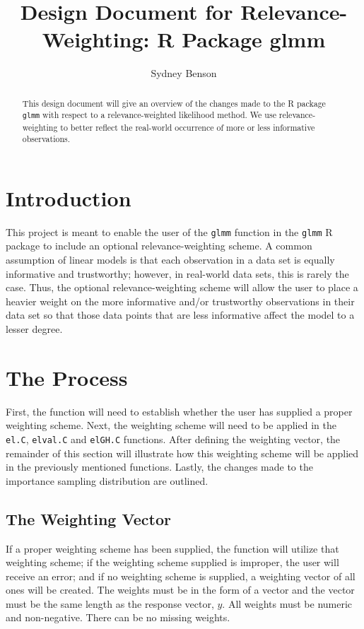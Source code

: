 \documentclass{article}
\title{Design Document for Relevance-Weighting: R Package glmm}
\author{Sydney Benson}
\begin{document}
\maketitle{}

\begin{abstract}
This design document will give an overview of the changes made to the R package \texttt{glmm} with respect to a relevance-weighted likelihood method. We use relevance-weighting to better reflect the real-world occurrence of more or less informative observations.
\end{abstract}

\section{Introduction}
This project is meant to enable the user of the \texttt{glmm} function in the \texttt{glmm} R package to include an optional relevance-weighting scheme. A common assumption of linear models is that each observation in a data set is equally informative and trustworthy; however, in real-world data sets, this is rarely the case. Thus, the optional relevance-weighting scheme will allow the user to place a heavier weight on the more informative and/or trustworthy observations in their data set so that those data points that are less informative affect the model to a lesser degree.

\section{The Process}
First, the function will need to establish whether the user has supplied a proper weighting scheme. Next, the weighting scheme will need to be applied in the \texttt{el.C}, \texttt{elval.C} and \texttt{elGH.C} functions. After defining the weighting vector, the remainder of this section will illustrate how this weighting scheme will be applied in the previously mentioned functions. Lastly, the changes made to the importance sampling distribution are outlined.

\subsection{The Weighting Vector}
If a proper weighting scheme has been supplied, the function will utilize that weighting scheme; if  the weighting scheme supplied is improper, the user will receive an error; and if no weighting scheme is supplied, a weighting vector of all ones will be created. The weights must be in the form of a vector and the vector must be the same length as the response vector, $y$. All weights must be numeric and non-negative. There can be no missing weights. 
\end{document}
